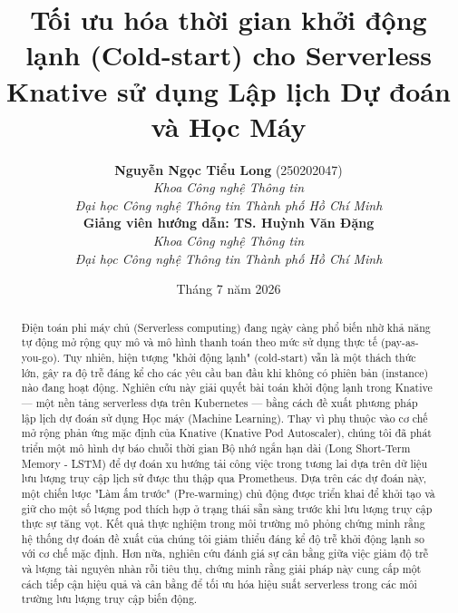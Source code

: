 \documentclass[12pt,a4paper]{article}
\begin{document}
\title{\LARGE\textbf{Tối ưu hóa thời gian khởi động lạnh (Cold-start) cho Serverless Knative sử dụng Lập lịch Dự đoán và Học Máy}}

\author{
\textbf{Nguyễn Ngọc Tiểu Long} (250202047)\\
\textit{Khoa Công nghệ Thông tin}\\
\textit{Đại học Công nghệ Thông tin Thành phố Hồ Chí Minh}\\[1ex]
\textbf{Giảng viên hướng dẫn: TS. Huỳnh Văn Đặng} \\
\textit{Khoa Công nghệ Thông tin}\\
\textit{Đại học Công nghệ Thông tin Thành phố Hồ Chí Minh}
}
\date{Tháng 7 năm 2026}

\maketitle
\newpage

\begin{abstract}
Điện toán phi máy chủ (Serverless computing) đang ngày càng phổ biến nhờ khả năng tự động mở rộng quy mô và mô hình thanh toán theo mức sử dụng thực tế (pay-as-you-go). Tuy nhiên, hiện tượng "khởi động lạnh" (cold-start) vẫn là một thách thức lớn, gây ra độ trễ đáng kể cho các yêu cầu ban đầu khi không có phiên bản (instance) nào đang hoạt động. Nghiên cứu này giải quyết bài toán khởi động lạnh trong Knative — một nền tảng serverless dựa trên Kubernetes — bằng cách đề xuất phương pháp lập lịch dự đoán sử dụng Học máy (Machine Learning). Thay vì phụ thuộc vào cơ chế mở rộng phản ứng mặc định của Knative (Knative Pod Autoscaler), chúng tôi đã phát triển một mô hình dự báo chuỗi thời gian Bộ nhớ ngắn hạn dài (Long Short-Term Memory - LSTM) để dự đoán xu hướng tải công việc trong tương lai dựa trên dữ liệu lưu lượng truy cập lịch sử được thu thập qua Prometheus. Dựa trên các dự đoán này, một chiến lược "Làm ấm trước" (Pre-warming) chủ động được triển khai để khởi tạo và giữ cho một số lượng pod thích hợp ở trạng thái sẵn sàng trước khi lưu lượng truy cập thực sự tăng vọt. Kết quả thực nghiệm trong môi trường mô phỏng chứng minh rằng hệ thống dự đoán đề xuất của chúng tôi giảm thiểu đáng kể độ trễ khởi động lạnh so với cơ chế mặc định. Hơn nữa, nghiên cứu đánh giá sự cân bằng giữa việc giảm độ trễ và lượng tài nguyên nhàn rỗi tiêu thụ, chứng minh rằng giải pháp này cung cấp một cách tiếp cận hiệu quả và cân bằng để tối ưu hóa hiệu suất serverless trong các môi trường lưu lượng truy cập biến động.
\end{abstract}
\end{document}
